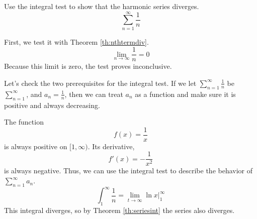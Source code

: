 \begin{ex}\label{famousp}
  Use the integral test to show that the harmonic series diverges.
  \[ \sum^\infty_{n=1} \frac{1}{n} \]
  \begin{sol}
    First, we test it with Theorem \ref{th:nthtermdiv}.
    \[ \lim_{n\to\infty} \frac{1}{n}=0\]
    Because this limit is zero, the test proves inconclusive.

    Let's check the two prerequisites for the integral test. If we let
    $\sum^\infty_{n=1} \frac{1}{n}$ be $\sum^\infty_{n=1}$, and $a_n =
    \frac{1}{n}$, then we can treat $a_n$ as a function and make sure it is
    positive and always decreasing.

    The function \[ f(x)=\frac{1}{x} \]is always positive on $[1, \infty)$.
    Its derivative, \[f'(x)=-\frac{1}{x^2}\] is always negative. Thus, we can
    use the integral test to describe the behavior of $\sum^\infty_{n=1} a_n$.
    \[
      \int^\infty_1 \frac{1}{n} = \lim_{t\to\infty} \ln x \bigg|^\infty_1
    \]
    This integral diverges, so by Theorem \ref{th:seriesint} the series also
    diverges.
  \end{sol}
\end{ex}
